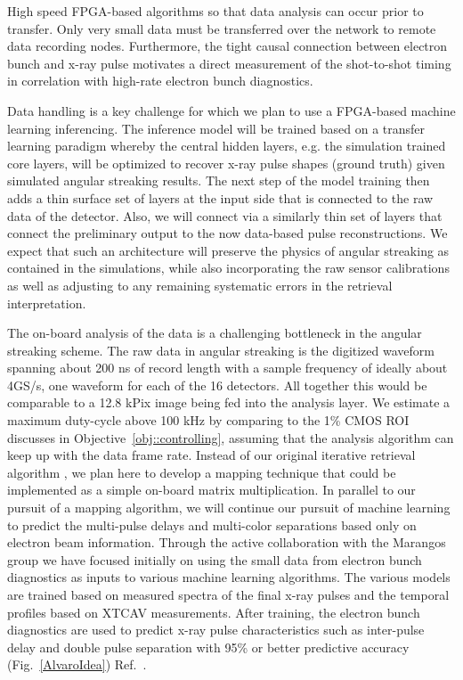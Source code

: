 High speed FPGA-based algorithms so that data analysis can occur prior to transfer.
Only very small data must be transferred over the network to remote data recording nodes.
Furthermore, the tight causal connection between electron bunch and x-ray pulse motivates a direct measurement of the shot-to-shot timing in correlation with high-rate electron bunch diagnostics. 


Data handling is a key challenge for which we plan to use a FPGA-based machine learning inferencing.
The inference model will be trained based on a transfer learning paradigm whereby the central hidden layers, e.g. the simulation trained core layers, will be optimized to recover x-ray pulse shapes (ground truth) given simulated angular streaking results.
The next step of the model training then adds a thin surface set of layers at the input side that is connected to the raw data of the detector.
Also, we will connect via a similarly thin set of layers that connect the preliminary output to the now data-based pulse reconstructions.
We expect that such an architecture will preserve the physics of angular streaking as contained in the simulations, while also incorporating the raw sensor calibrations as well as adjusting to any remaining systematic errors in the retrieval interpretation.

The on-board analysis of the data is a challenging bottleneck in the angular streaking scheme.
The raw data in angular streaking is the digitized waveform spanning about 200 ns of record length with a sample frequency of ideally about 4GS/s, one waveform for each of the 16 detectors.
All together this would be comparable to a 12.8 kPix image being fed into the analysis layer.
We estimate a maximum duty-cycle above 100 kHz by comparing to the 1\% CMOS ROI discusses in Objective~\ref{obj::controlling}, assuming that the analysis algorithm can keep up with the data frame rate.
Instead of our original iterative retrieval algorithm \cite{Nick2016}, we plan here to develop a mapping technique that could be implemented as a simple on-board matrix multiplication.
In parallel to our pursuit of a mapping algorithm, we will continue our pursuit of machine learning to predict the multi-pulse delays and multi-color separations based only on electron beam information.
Through the active collaboration with the Marangos group we have focused initially on using the small data from electron bunch diagnostics as inputs to various machine learning algorithms. \cite{AlvaroML2016}
The various models are trained based on measured spectra of the final x-ray pulses and the temporal profiles based on XTCAV measurements.
After training, the electron bunch diagnostics are used to predict x-ray pulse characteristics such as inter-pulse delay and double pulse separation with 95\% or better predictive accuracy (Fig.~\ref{AlvaroIdea}) Ref.~\cite{AlvaroML2016}. 

